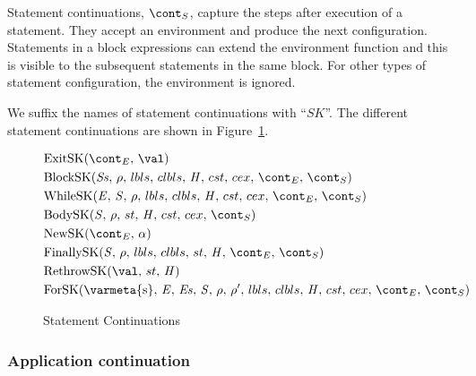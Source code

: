 \documentclass{article}
\begin{document}
Statement continuations, $\scont$, capture the steps after execution of a statement.
They accept an environment and produce the next configuration.
Statements in a block expressions can extend the environment function and this is visible to the subsequent statements in the same block.
For other types of statement configuration, the environment is ignored.

\noindent
We suffix the names of statement continuations with ``$SK$''.
The different statement continuations are shown in Figure~\ref{figure:sconts}.
\newcommand{\ExitSK}[1]{\mathrm{ExitSK}(\econt,\,#1)}
\newcommand{\BlockSK}[2]{\mathrm{BlockSK}({#1},\,{#2},\,\lbls,\,\clbls,\,\handler,\,\cstrace,\,\cex,\,\econt,\,\scont)}
\newcommand{\WhileSK}{\mathrm{WhileSK}(\expr,\,\stmt,\,\env,\,\lbls,\,\clbls,\,\handler,\,\cstrace,\,\cex,\,\econt,\,\scont)}
\newcommand{\BodySK}[3]{\mathrm{BodySK}({#1},\,{#2},\,\strace,\,\handler,\,\cstrace,\,\cex,\,{#3})}
\newcommand{\NewSK}[2]{\mathrm{NewSK}({#1},\,{#2})}
\newcommand{\FinallySK}[1]{\mathrm{FinallySK}({#1},\,\env,\,\lbls,\,\clbls,\,\strace,\,\handler,\,\econt,\,\scont)}
\newcommand{\RethrowSK}[3]{\mathrm{RethrowSK}({#1},\,{#2},\,{#3})}
%
\newcommand{\ForSK}{\mathrm{ForSK}(\mathrm{\varmeta{s}},\, \expressionmeta,\, \exprs,\, \statementmeta,\, \env,\, \env',\, \lbls,\, \clbls,\, \handler,\, \cstrace,\, \cex,\, \econt,\, \scont)}
\begin{figure}[Htp]
  \begin{align}
	&\ExitSK{\val} \label{scont:exit}\\
	&\BlockSK{\stmts}{\env} \label{scont:block}\\
	&\WhileSK \label{scont:while}\\
	&\BodySK{\stmt}{\env}{\scont} \label{scont:body}\\
	&\NewSK{\econt}{\loc} \label{scont:new}\\
	&\FinallySK{\stmt} \label{scont:finally}\\
	&\RethrowSK{\val}{\strace}{\handler} \label{scont:rethrow}\\
	&\ForSK \label{scont:for}
  \end{align}
  \caption{Statement Continuations}
  \label{figure:sconts}
\end{figure}

\subsubsection{Application continuation}
\label{subsubsec:application-continuation}
\end{document}
